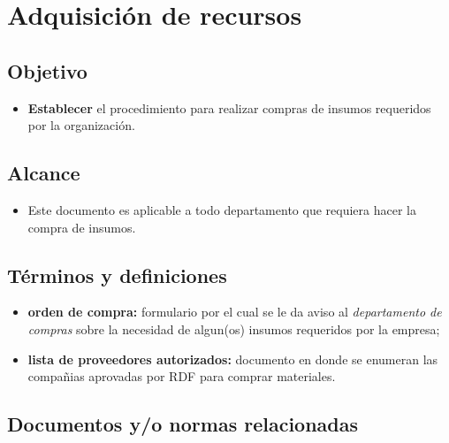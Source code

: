 \thispagestyle{formato-PI}
\renewcommand{\MayorVer}{2}
\renewcommand{\MenorVer}{0}
\renewcommand{\Codigo}{BPD-9-PRO}
\renewcommand{\FechaPub}{2023--01}
\renewcommand{\Titulo}{Adquisición de recursos}
\section{\Titulo}

\subsection{Objetivo}

\begin{itemize}
	\item \textbf{Establecer} el procedimiento para realizar compras de insumos requeridos por la organización.
\end{itemize}

\subsection{Alcance}

\begin{itemize}
	\item Este documento es aplicable a todo departamento que requiera hacer la compra de insumos.
\end{itemize}

\subsection{Términos y definiciones}

\begin{itemize}
	\item \textbf{orden de compra:} formulario por el cual se le da aviso al \emph{departamento de compras} sobre la necesidad de algun(os) insumos requeridos por la empresa;
	\item \textbf{lista de proveedores autorizados:} documento en donde se enumeran las compañias aprovadas por RDF para comprar materiales.
\end{itemize}

\subsection{Documentos y/o normas relacionadas}

